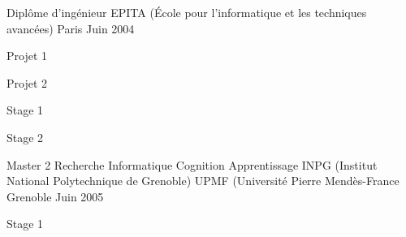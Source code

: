

\begin{cventries}

  \cventry
    {Diplôme d'ingénieur} %
    {EPITA (École pour l'informatique et les techniques avancées)} %
    {Paris} %
    {Juin 2004} %
    {
      \begin{cvitems} %
        \item {Projet 1}
        \item {Projet 2}
        \item {Stage 1}
        \item {Stage 2}
      \end{cvitems}
    }

  \cventry
    {Master 2 Recherche Informatique Cognition Apprentissage} %
    {INPG (Institut National Polytechnique de Grenoble) \linebreak UPMF (Université Pierre Mendès-France} %
    {Grenoble} %
    {Juin 2005} %
    {
      \begin{cvitems} %
        \item {Stage 1}
      \end{cvitems}
    }

\end{cventries}
